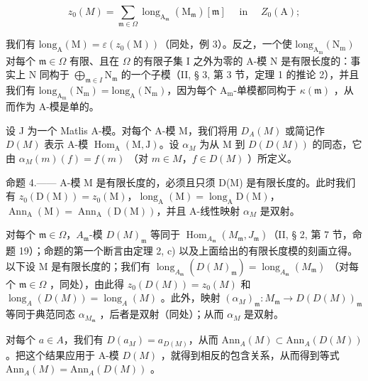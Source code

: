 \[
z _ {0} (M) = \sum_ {\mathfrak {m} \in \Omega} \operatorname{long} _ {\mathrm{A} _ {\mathfrak {m}}} (\mathrm{M} _ {\mathfrak {m}}) [ \mathfrak {m} ] \quad \text { in } \quad Z _ {0} (\mathrm{A});
\]

我们有 \(\mathrm{long}_{\mathrm{A}}(\mathrm{M}) = \varepsilon(z_0(\mathrm{M}))\)（同处，例 3）。反之，一个使 \(\mathrm{long}_{\mathrm{A_m}}(\mathrm{N_m})\) 对每个 \(\mathfrak{m} \in \Omega\) 有限、且在 \(\Omega\) 的有限子集 I 之外为零的 A-模 N 是有限长度的：事实上 N 同构于 \(\bigoplus_{\mathfrak{m} \in I} \mathrm{N}_{\mathfrak{m}}\) 的一个子模（II, § 3, 第 3 节，定理 1 的推论 2），并且我们有 \(\mathrm{long}_{\mathrm{A_m}}(\mathrm{N_m}) = \mathrm{long}_\mathrm{A}(\mathrm{N_m})\)，因为每个 \(\mathrm{A_m}\)-单模都同构于 \(\kappa(\mathfrak{m})\) ，从而作为 A-模是单的。

设 J 为一个 Matlis A-模。对每个 A-模 M，我们将用 \(D_{A}(M)\) 或简记作 \(D(M)\) 表示 A-模 \(\operatorname{Hom}_{\mathrm{A}}(\mathrm{M},\mathrm{J})\)。设 \(\alpha_{M}\) 为从 M 到 \(D(D(M))\) 的同态，它由 \(\alpha_{M}(m)(f)=f(m)\) （对 \(m\in M\)，\(f\in D(M)\) ）所定义。

命题 4.—— A-模 M 是有限长度的，必须且只须 D(M) 是有限长度的。此时我们有 \(z_{0}(\mathrm{D}(\mathrm{M})) = z_{0}(\mathrm{M})\)，\(\operatorname{long}_{\mathrm{A}}(\mathrm{M}) = \operatorname{long}_{\mathrm{A}}\mathrm{D}(\mathrm{M})\)，\(\operatorname{Ann}_{\mathrm{A}}(\mathrm{M}) = \operatorname{Ann}_{\mathrm{A}}(\mathrm{D}(\mathrm{M}))\)，并且 A-线性映射 \(\alpha_{M}\) 是双射。

对每个 \(\mathfrak{m} \in \Omega\)，\(A_{\mathfrak{m}}\)-模 \(D(M)_{\mathfrak{m}}\) 等同于 \(\operatorname{Hom}_{A_{\mathfrak{m}}} (M_{\mathfrak{m}}, J_{\mathfrak{m}})\)（II, § 2, 第 7 节，命题 19）；命题的第一个断言由定理 2, c) 以及上面给出的有限长度模的刻画立得。以下设 M 是有限长度的；我们有 \(\operatorname{long}_{A_{\mathfrak{m}}} (D(M)_{\mathfrak{m}}) = \operatorname{long}_{A_{\mathfrak{m}}} (M_{\mathfrak{m}})\) （对每个 \(\mathfrak{m} \in \Omega\) ，同处），由此得 \(z_0(D(M)) = z_0(M)\) 和 \(\operatorname{long}_A(D(M)) = \operatorname{long}_A(M)\) 。此外，映射 \((\alpha_{M})_{\mathfrak{m}}: M_{\mathfrak{m}} \to D(D(M))_{\mathfrak{m}}\) 等同于典范同态 \(\alpha_{M_{\mathfrak{m}}}\) ，后者是双射（同处）；从而 \(\alpha_{M}\) 是双射。

对每个 \(a \in A\)，我们有 \(D(a_{M}) = a_{D(M)}\)，从而 \(\text{Ann}_{A}(M) \subset \text{Ann}_{A}(D(M))\)。把这个结果应用于 A-模 \(D(M)\) ，就得到相反的包含关系，从而得到等式 \(\text{Ann}_{A}(M) = \text{Ann}_{A}(D(M))\) 。

